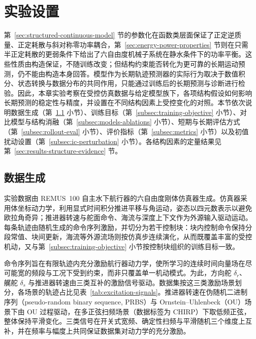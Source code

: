 \documentclass[UTF8,zihao=-4]{ctexrep}
\begin{document}
\section{实验设置}
\label{sec:training-baselines-protocol}

第~\ref{sec:structured-continuous-model} 节的参数化在函数类层面保证了正定逆质量、正定耗散与斜对称零功率耦合，第~\ref{sec:energy-power-properties} 节则在只需半正定耗散的更弱条件下给出了六自由度机械子系统在静水条件下的功率平衡。这些性质由构造保证，不随训练改变；但结构约束能否转化为更可靠的长期运动预测，仍不能由构造本身回答。模型作为长期轨迹预测器的实际行为取决于数值积分、状态转换与数据分布的共同作用，只能通过训练后的长期预测与诊断进行检验。因此，本章实验考察在受控仿真数据与给定模型族下，各项结构假设如何影响长期预测的稳定性与精度，并设置在不同结构因素上受控变化的对照。本节依次说明数据生成（第~\ref{subsec:data-generation} 小节）、训练目标（第~\ref{subsec:training-objective} 小节）、对比模型与结构消融（第~\ref{subsec:models-ablations} 小节）、短期与长期评估方式（第~\ref{subsec:rollout-eval} 小节）、评价指标（第~\ref{subsec:metrics} 小节）以及初值扰动设置（第~\ref{subsec:ic-perturbation} 小节）。各结构因素的定量结果见第~\ref{sec:results-structure-evidence} 节。

\subsection{数据生成}
\label{subsec:data-generation}

实验数据由 REMUS~100 自主水下航行器的六自由度刚体仿真器生成。仿真器采用体坐标动力学，利用显式时间积分推进平移与角运动，姿态以四元数表示以避免欧拉角奇异；推进器转速与舵面命令、海流与深度上下文作为外源输入驱动运动。每条轨迹由随机生成的命令序列激励，并切分为若干控制块：块内控制命令保持分段常值、块间更新，海流等外源流场则按仿真步连续演化，从而既覆盖丰富的受控机动，又与第~\ref{subsec:training-objective} 小节按控制块组织的训练目标一致。

命令序列旨在有限轨迹内充分激励航行器动力学，使所学习的连续时间向量场在尽可能宽的频段与工况下受到约束，而非只覆盖单一机动模式。为此，方向舵 \(\delta_r\)、艉舵 \(\delta_s\) 与推进器转速由三类互补的激励信号驱动。数据集按这三类激励场景划分，各场景的轨迹占比见表~\ref{tab:excitation-signals}。推进器转速在伪随机二进制序列（pseudo-random binary sequence, PRBS）与 Ornstein--Uhlenbeck（OU）场景下由 OU 过程驱动，在多正弦扫频场景（数据标签为 CHIRP）下取低频正弦，整体保持平滑变化。三类信号在开关式宽频、确定性扫频与平滑随机三个维度上互补，并在频率与幅度上共同保证数据集对动力学的充分激励。
\end{document}
